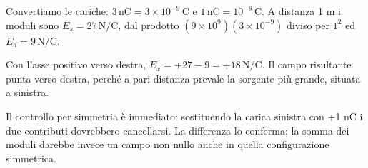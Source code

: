 \documentclass[11pt,a4paper]{article}
\begin{document}
\begin{samepage}
Convertiamo le cariche: \(3\,\mathrm{nC}=3\times10^{-9}\,\mathrm C\) e \(1\,\mathrm{nC}=10^{-9}\,\mathrm C\). A distanza 1 m i moduli sono \(E_s=27\,\mathrm{N/C}\), dal prodotto \((9\times10^9)(3\times10^{-9})\) diviso per \(1^2\) ed \(E_d=9\,\mathrm{N/C}\).\par

Con l’asse positivo verso destra, \(E_x=+27-9=+18\,\mathrm{N/C}\). Il campo risultante punta verso destra, perché a pari distanza prevale la sorgente più grande, situata a sinistra.\par

Il controllo per simmetria è immediato: sostituendo la carica sinistra con +1 nC i due contributi dovrebbero cancellarsi. La differenza lo conferma; la somma dei moduli darebbe invece un campo non nullo anche in quella configurazione simmetrica.\par

\end{samepage}
\newpage
\end{document}
